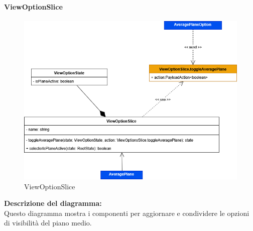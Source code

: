 \paragraph{ViewOptionSlice}
\begin{figure}[h!] \centering
      \includegraphics[scale=0.45]{template/images/uml_front/logic/ViewOptionSlice.png}
      \caption{ViewOptionSlice}
\end{figure}
\textbf{Descrizione del diagramma:}\\
Questo diagramma mostra i componenti per aggiornare e condividere le opzioni di visibilità del piano medio.
